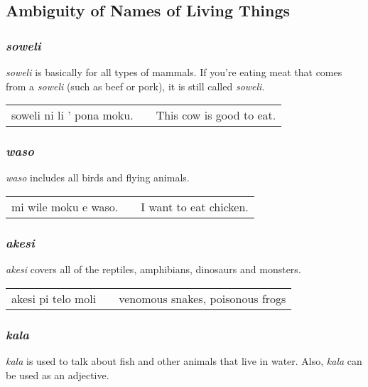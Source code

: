 \subsection*{Ambiguity of Names of Living Things}
%
\subsubsection*{\textit{soweli}}
%
%
\textit{soweli} is basically for all types of mammals. 
If you're eating meat that comes from a \textit{soweli} (such as beef or pork), it is still called \textit{soweli}. 

\begin{supertabular}{p{5,5cm}|ll}
soweli ni li ' pona moku. && This cow is good to eat. \\
\end{supertabular} 
%
\subsubsection*{\textit{waso}}
%
%
\textit{waso} includes all birds and flying animals. 

\begin{supertabular}{p{5,5cm}|ll}
mi wile moku e waso. && I want to eat chicken. \\
\end{supertabular} 
%
%
\subsubsection*{\textit{akesi}}
%
%
\textit{akesi} covers all of the reptiles, amphibians, dinosaurs and monsters.

\begin{supertabular}{p{5,5cm}|ll}
akesi pi telo moli && venomous snakes, poisonous frogs \\
\end{supertabular} 
%
%
\subsubsection*{\textit{kala}}
%
%
\textit{kala} is used to talk about fish and other animals that live in water. 
Also, \textit{kala} can be used as an adjective. 

